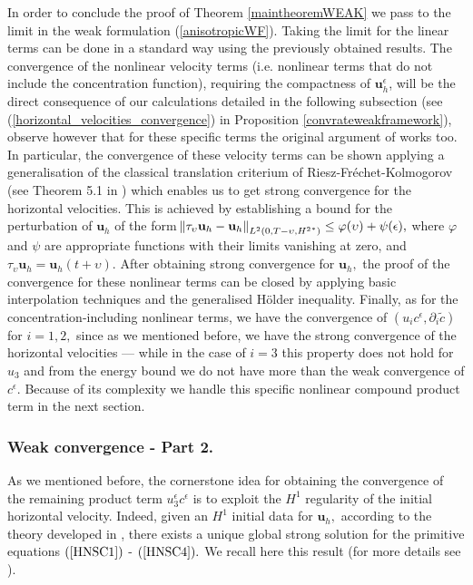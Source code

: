 \documentclass[11pt]{article}
\begin{document}
In order to conclude the proof of Theorem \ref{maintheoremWEAK} we pass to the limit in the weak formulation (\ref{anisotropicWF}). Taking the limit for the linear terms can be done in a standard way using the previously obtained results.
The convergence of the nonlinear velocity terms (i.e. nonlinear terms that do not include the concentration function), requiring the compactness of $\mathbf{u}_h^\epsilon$, will be the direct consequence of our calculations detailed in the following subsection (see (\ref{horizontal_velocities_convergence}) in Proposition \ref{convrateweakframework}), observe however that for these specific terms the original argument of \cite{pollatmws2019} works too. In particular, the convergence of these velocity terms can be shown applying a generalisation of the classical translation criterium of Riesz-Fr\'echet-Kolmogorov (see Theorem 5.1 in \cite{azerad2001mathematical}) which enables us to get strong convergence for the horizontal velocities. This is achieved by establishing a bound for the perturbation of $\mathbf{u}_h$ of the form $\norm{\tau_\upsilon \mathbf{u}_h - \mathbf{u}_h}_{L^2(0,T-\upsilon, {H^2}^*)} \leq \varphi(\upsilon) + \psi(\epsilon),$ where $\varphi$ and $\psi$ are appropriate functions with their limits vanishing at zero, and $\tau_\upsilon \mathbf{u}_h = \mathbf{u}_h (t+\upsilon) $. After obtaining strong convergence for $\mathbf{u}_h,$ the proof of the convergence for these nonlinear terms can be closed by applying basic interpolation techniques and the generalised H\"older inequality. 
Finally, as for the concentration-including nonlinear terms, we have the convergence of $(u_i c^\epsilon, \partial_i \tilde{c})$ for $i=1,2,$ since as we mentioned before, we have the strong convergence of the horizontal velocities --- while in the case of $i=3$ this property does not hold for $u_3$ and from the energy bound we do not have more than the weak convergence of $c^\epsilon$. Because of its complexity we handle this specific nonlinear compound product term in the next section.

\subsubsection{Weak convergence - Part 2.}

As we mentioned before, the cornerstone idea for obtaining the convergence of the remaining product term $u_3^\epsilon c^\epsilon$ is to exploit the $H^1$ regularity of the initial horizontal velocity. Indeed, given an $H^1$ initial data for $\mathbf{u}_h,$ according to the theory developed in \cite{cao2007global}, there exists a unique global strong solution for the primitive equations $(\ref{HNSC1})$ - $(\ref{HNSC4}).$ We recall here this result (for more details see \cite{cao2007global}).
\end{document}
